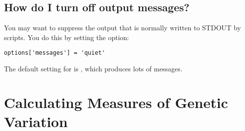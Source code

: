 \subsection{How do I turn off output messages?}
\label{sec:howto-turn-off-messages}
You may want to suppress the output that is normally written to STDOUT by scripts.  You do this by setting the  option:
\begin{verbatim}
options['messages'] = 'quiet'
\end{verbatim}
The default setting for  is , which produces lots of messages.
\section{Calculating Measures of Genetic Variation}
\label{sec:howto-genetic-variation}
